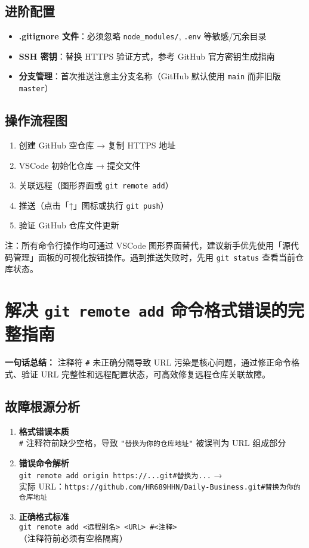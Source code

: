 \subsection{进阶配置}
\begin{itemize}[leftmargin=*, nosep]
\item \textbf{.gitignore 文件}：必须忽略 \texttt{node\_modules/}, \texttt{.env} 等敏感/冗余目录
\item \textbf{SSH 密钥}：替换 HTTPS 验证方式，参考 GitHub 官方密钥生成指南
\item \textbf{分支管理}：首次推送注意主分支名称（GitHub 默认使用 \texttt{main} 而非旧版 \texttt{master}）
\end{itemize}

\subsection{操作流程图}
\begin{enumerate}[leftmargin=*, nosep]
\item 创建 GitHub 空仓库 → 复制 HTTPS 地址
\item VSCode 初始化仓库 → 提交文件
\item 关联远程（图形界面或 \texttt{git remote add}）
\item 推送（点击「↑」图标或执行 \texttt{git push}）
\item 验证 GitHub 仓库文件更新
\end{enumerate}

注：所有命令行操作均可通过 VSCode 图形界面替代，建议新手优先使用「源代码管理」面板的可视化按钮操作。遇到推送失败时，先用 \texttt{git status} 查看当前仓库状态。


\section{解决 \texttt{git remote add} 命令格式错误的完整指南}

\textbf{一句话总结：}
注释符 \texttt{\#} 未正确分隔导致 URL 污染是核心问题，通过修正命令格式、验证 URL 完整性和远程配置状态，可高效修复远程仓库关联故障。

\subsection{故障根源分析}
\begin{enumerate}[leftmargin=*, nosep]
\item \textbf{格式错误本质} \\
\texttt{\#} 注释符前缺少空格，导致 \texttt{"替换为你的仓库地址"} 被误判为 URL 组成部分

\item \textbf{错误命令解析} \\
\texttt{git remote add origin https://...git\#替换为...} → \\
实际 URL：\texttt{https://github.com/HR689HHN/Daily-Business.git\#替换为你的仓库地址}

\item \textbf{正确格式标准} \\
\texttt{git remote add <远程别名> <URL> \#<注释>} \\
（注释符前必须有空格隔离）
\end{enumerate}

